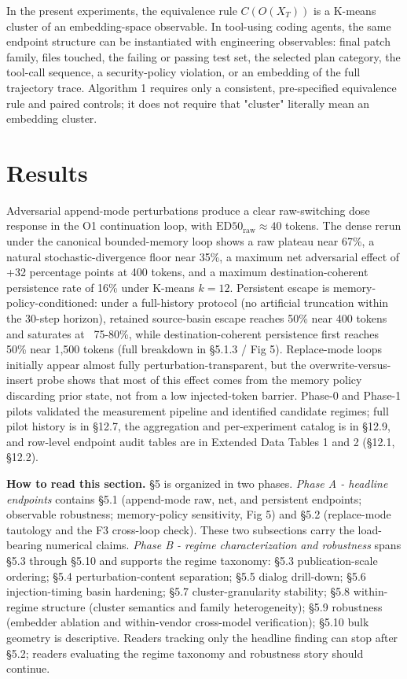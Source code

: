\documentclass{article}
\theoremstyle{plain}
\theoremstyle{definition}
\begin{document}
In the present experiments, the equivalence rule \(C(O(X_T))\) is a K-means cluster of an embedding-space observable. In tool-using coding agents, the same endpoint structure can be instantiated with engineering observables: final patch family, files touched, the failing or passing test set, the selected plan category, the tool-call sequence, a security-policy violation, or an embedding of the full trajectory trace. Algorithm 1 requires only a consistent, pre-specified equivalence rule and paired controls; it does not require that "cluster" literally mean an embedding cluster.

\section{Results}

Adversarial append-mode perturbations produce a clear raw-switching dose response in the O1 continuation loop, with $\mathrm{ED50}_{\mathrm{raw}} \approx 40$ tokens. The dense rerun under the canonical bounded-memory loop shows a raw plateau near 67\%, a natural stochastic-divergence floor near 35\%, a maximum net adversarial effect of +32 percentage points at 400 tokens, and a maximum destination-coherent persistence rate of 16\% under K-means $k=12$. Persistent escape is memory-policy-conditioned: under a full-history protocol (no artificial truncation within the 30-step horizon), retained source-basin escape reaches 50\% near 400 tokens and saturates at ~75-80\%, while destination-coherent persistence first reaches 50\% near 1,500 tokens (full breakdown in §5.1.3 / Fig 5). Replace-mode loops initially appear almost fully perturbation-transparent, but the overwrite-versus-insert probe shows that most of this effect comes from the memory policy discarding prior state, not from a low injected-token barrier. Phase-0 and Phase-1 pilots validated the measurement pipeline and identified candidate regimes; full pilot history is in §12.7, the aggregation and per-experiment catalog is in §12.9, and row-level endpoint audit tables are in Extended Data Tables 1 and 2 (§12.1, §12.2).

\textbf{How to read this section.} §5 is organized in two phases. \textit{Phase A - headline endpoints} contains §5.1 (append-mode raw, net, and persistent endpoints; observable robustness; memory-policy sensitivity, Fig 5) and §5.2 (replace-mode tautology and the F3 cross-loop check). These two subsections carry the load-bearing numerical claims. \textit{Phase B - regime characterization and robustness} spans §5.3 through §5.10 and supports the regime taxonomy: §5.3 publication-scale ordering; §5.4 perturbation-content separation; §5.5 dialog drill-down; §5.6 injection-timing basin hardening; §5.7 cluster-granularity stability; §5.8 within-regime structure (cluster semantics and family heterogeneity); §5.9 robustness (embedder ablation and within-vendor cross-model verification); §5.10 bulk geometry is descriptive. Readers tracking only the headline finding can stop after §5.2; readers evaluating the regime taxonomy and robustness story should continue.
\end{document}
